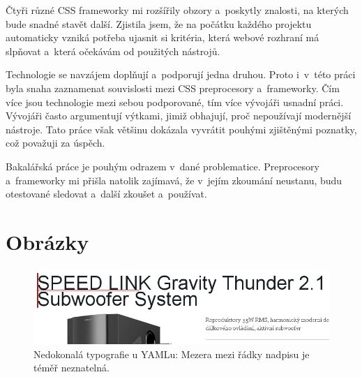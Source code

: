 \documentclass[thesis=B,czech]{FITthesis}[2012/06/26]
\begin{document}
\begin{conclusion}
	Čtyři různé \gls{CSS} frameworky mi rozšířily obzory a~poskytly znalosti, na kterých bude snadné stavět další. Zjistila jsem, že na počátku každého projektu automaticky vzniká potřeba ujasnit si kritéria, která webové rozhraní má slpňovat a~která očekávám od použitých nástrojů. 

Technologie se navzájem doplňují a~podporují jedna druhou. Proto i~v~této práci byla snaha zaznamenat souvislosti mezi \gls{CSS} preprocesory a~frameworky. Čím více jsou technologie mezi sebou podporované, tím více vývojáři usnadní práci. Vývojáři často argumentují výtkami, jimiž obhajují, proč nepoužívají modernější nástroje. Tato práce však většinu dokázala vyvrátit pouhými zjištěnými poznatky, což považuji za úspěch. 

Bakalářská práce je pouhým odrazem v~dané problematice. Preprocesory a~frameworky mi přišla natolik zajímavá, že v~jejím zkoumání neustanu, budu otestované sledovat a~další zkoušet a~používat.  

\end{conclusion}




\appendix
\chapter{Obrázky}

\begin{figure}[h]
	\begin{center}
	\includegraphics[scale=0.7]{images/image04.png}
	\end{center}
	\caption[Nedokonalá typografie u YAMLu]{Nedokonalá typografie u YAMLu: Mezera mezi řádky nadpisu je téměř neznatelná.}
	\label{imgTyp}
\end{figure}
\end{document}
